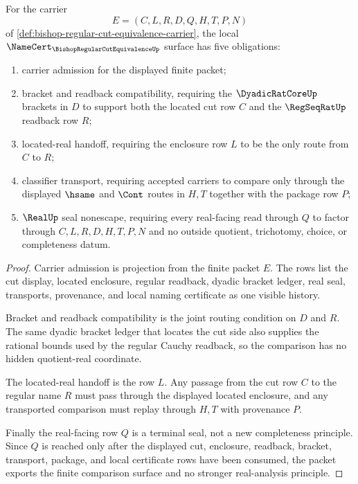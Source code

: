 \begin{theorem}
\label{thm:bishop-regular-cut-equivalence-namecert-obligations}
For the carrier
$$
E=(C,L,R,D,Q,H,T,P,N)
$$
of \autoref{def:bishop-regular-cut-equivalence-carrier}, the local $\NameCert_{\BishopRegularCutEquivalenceUp}$ surface has five obligations:
\begin{enumerate}
\item carrier admission for the displayed finite packet;
\item bracket and readback compatibility, requiring the $\DyadicRatCoreUp$ brackets in $D$ to support both the located cut row $C$ and the $\RegSeqRatUp$ readback row $R$;
\item located-real handoff, requiring the enclosure row $L$ to be the only route from $C$ to $R$;
\item classifier transport, requiring accepted carriers to compare only through the displayed $\hsame$ and $\Cont$ routes in $H,T$ together with the package row $P$;
\item $\RealUp$ seal nonescape, requiring every real-facing read through $Q$ to factor through $C,L,R,D,H,T,P,N$ and no outside quotient, trichotomy, choice, or completeness datum.
\end{enumerate}
\end{theorem}
\begin{proof}
Carrier admission is projection from the finite packet $E$. The rows list the cut display, located enclosure, regular readback, dyadic bracket ledger, real seal, transports, provenance, and local naming certificate as one visible history.

Bracket and readback compatibility is the joint routing condition on $D$ and $R$. The same dyadic bracket ledger that locates the cut side also supplies the rational bounds used by the regular Cauchy readback, so the comparison has no hidden quotient-real coordinate.

The located-real handoff is the row $L$. Any passage from the cut row $C$ to the regular name $R$ must pass through the displayed located enclosure, and any transported comparison must replay through $H,T$ with provenance $P$.

Finally the real-facing row $Q$ is a terminal seal, not a new completeness principle. Since $Q$ is reached only after the displayed cut, enclosure, readback, bracket, transport, package, and local certificate rows have been consumed, the packet exports the finite comparison surface and no stronger real-analysis principle.
\end{proof}

